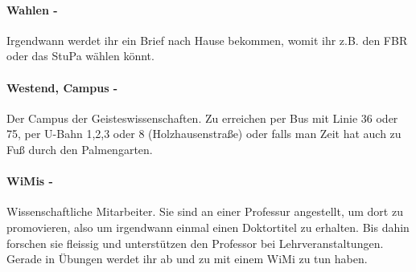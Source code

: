 \paragraph{Wahlen -} Irgendwann werdet ihr ein Brief nach Hause bekommen, womit ihr z.B. den FBR oder das StuPa wählen könnt.
\paragraph{Westend, Campus -} Der Campus der Geisteswissenschaften. Zu erreichen per Bus mit Linie 36 oder 75, per U-Bahn 1,2,3 oder 8 (Holzhausenstraße) oder falls man Zeit hat auch zu Fuß durch den Palmengarten.
\paragraph{WiMis -} Wissenschaftliche Mitarbeiter. Sie sind an einer Professur angestellt, um dort zu promovieren, also um irgendwann einmal einen Doktortitel zu erhalten. Bis dahin forschen sie fleissig und unterstützen den Professor bei Lehrveranstaltungen. Gerade in Übungen werdet ihr ab und zu mit einem WiMi zu tun haben.
\spaltenende